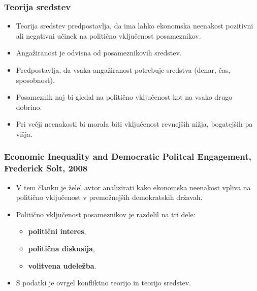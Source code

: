 \documentclass[10pt]{beamer}
\begin{document}
\begin{frame}
\frametitle{Teorija sredstev}
\begin{itemize}
\item Teorija sredstev predpostavlja, da ima lahko ekonomska neenakost pozitivni ali negativni učinek na politično vključenost posameznikov.
\item Angažiranost je odvisna od posameznikovih sredstev.
\item Predpostavlja, da vsaka angažiranost potrebuje sredstva (denar, čas, sposobnost).
\item Posameznik naj bi gledal na politično vključenost kot na vsako drugo dobrino.
\item Pri večji neenakosti bi morala biti vključenost revnejših nižja, bogatejših pa višja.
\end{itemize}
\end{frame}

\begin{frame}
\frametitle{Economic Inequality and Democratic Politcal Engagement, Frederick Solt, 2008}
\begin{itemize}
\item V tem članku je želel avtor analizirati kako ekonomska neenakost vpliva na politično vključenost v premožnejših demokratskih državah.
\item Politično vključenost posameznikov je razdelil na tri dele:
	\begin{itemize}
	\item \textbf{politični interes},
	\item \textbf{politična diskusija},
	\item \textbf{volitvena udeležba}.
	\end{itemize}
\item S podatki je ovrgel konfliktno teorijo in teorijo sredstev.
\end{itemize}
\end{frame}
\end{document}
